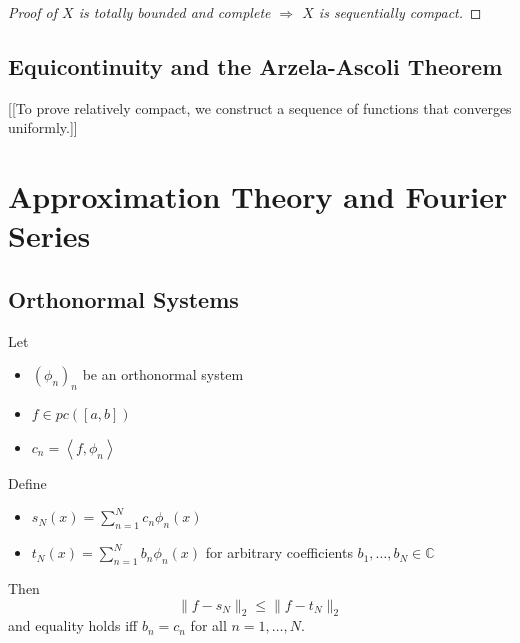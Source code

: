 \documentclass[11pt]{article}
\numberwithin{equation}{section}
\theoremstyle{definition}
\theoremstyle{definition}
\newcommand\angles[1]{\left\langle #1 \right\rangle}
\newcommand\norm[1]{\lVert#1\rVert}
\def\imp{\Rightarrow}
\newcommand{\1}{\mathbbm 1}
\newcommand{\CC}{\mathbb C}
\begin{document}
\begin{proof}[Proof of $X$ is totally bounded and complete $\imp$ $X$ is sequentially compact]
\end{proof}

\subsection{Equicontinuity and the Arzela-Ascoli Theorem}

[[To prove relatively compact, we construct a sequence of functions that converges uniformly.]]

\newpage

\section{Approximation Theory and Fourier Series}

\subsection{Orthonormal Systems}

\begin{theorem}
	Let
	\begin{itemize}
		\item $(\phi_n)_n$ be an orthonormal system 
		\item $f \in pc([a,b])$
		\item $c_n = \angles{f,\phi_n}$
	\end{itemize}
	Define
	\begin{itemize}
		\item $s_N(x) = \sum_{n=1}^N c_n \phi_n(x)$
		\item $t_N(x) = \sum_{n=1}^N b_n \phi_n(x)$ for arbitrary coefficients $b_1,\ldots,b_N \in \CC$
	\end{itemize}
	Then
	\begin{equation}
		\norm{f - s_N}_2 \leq \norm{f - t_N}_2
	\end{equation}
	and equality holds iff $b_n = c_n$ for all $n=1,\ldots,N$.
\end{theorem}
\end{document}
